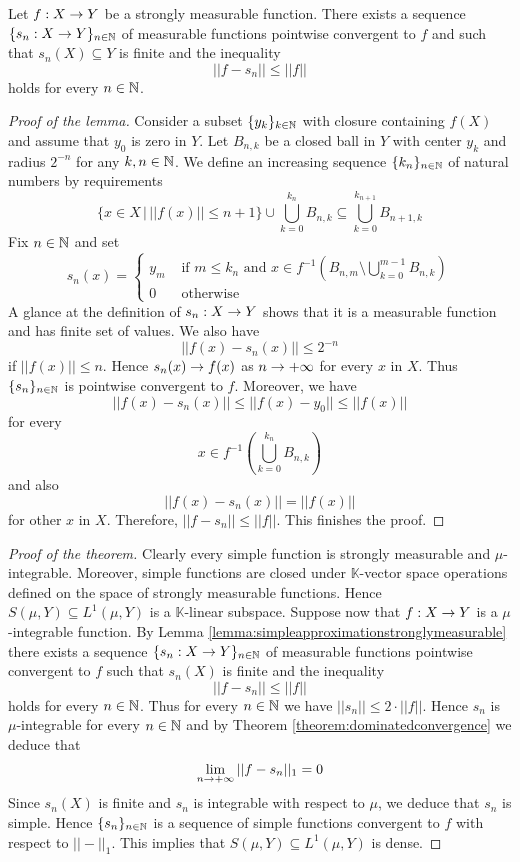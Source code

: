 \begin{lemma}\label{lemma:simpleapproximationstronglymeasurable}
Let $f:X\rightarrow Y$ be a strongly measurable function. There exists a sequence $\{s_n:X\rightarrow Y\}_{n\in {\mathbb N}}$ of measurable functions pointwise convergent to $f$ and such that $s_n(X)\subseteq Y$ is finite and the inequality
$$||f - s_n||\leq ||f||$$
holds for every $n\in {\mathbb N}$.
\end{lemma}
\begin{proof}[Proof of the lemma]
Consider a subset $\{y_k\}_{k\in {\mathbb N}}$ with closure containing $f(X)$ and assume that $y_0$ is zero in $Y$. Let $B_{n,k}$ be a closed ball in $Y$ with center $y_k$ and radius $2^{-n}$ for any $k,n\in {\mathbb N}$. We define an increasing sequence $\{k_n\}_{n\in {\mathbb N}}$ of natural numbers by requirements
$$\big\{x\in X\,\big|\,||f(x)||\leq n+1\big\} \cup \bigcup_{k=0}^{k_n}B_{n, k}\subseteq \bigcup_{k=0}^{k_{n+1}}B_{n+1, k}$$
Fix $n\in {\mathbb N}$ and set
$$s_n(x) = \begin{cases}
y_m & \mbox{ if }m\leq k_n\mbox{ and }x\in f^{-1}\left(B_{n, m}\setminus \bigcup_{k=0}^{m-1}B_{n, k}\right)\\
0 & \mbox{ otherwise}
\end{cases}$$
A glance at the definition of $s_n:X\rightarrow Y$ shows that it is a measurable function and has finite set of values. We also have
$$||f(x) - s_n(x)||\leq 2^{-n}$$
if $||f(x)||\leq n$. Hence $s_n(x) \rightarrow f(x)$ as $n\rightarrow +\infty$ for every $x$ in $X$. Thus $\{s_n\}_{n\in {\mathbb N}}$ is pointwise convergent to $f$. Moreover, we have
$$||f(x) - s_n(x)||\leq ||f(x) - y_0||\leq ||f(x)||$$
for every
$$x\in f^{-1}\left(\bigcup_{k=0}^{k_n}B_{n,k}\right)$$
and also
$$||f(x) - s_n(x)|| = ||f(x)||$$
for other $x$ in $X$. Therefore, $||f - s_n||\leq ||f||$. This finishes the proof.
\end{proof}

\begin{proof}[Proof of the theorem]
Clearly every simple function is strongly measurable and $\mu$-integrable. Moreover, simple functions are closed under $\mathbb{K}$-vector space operations defined on the space of strongly measurable functions. Hence $S(\mu, Y)\subseteq L^1(\mu, Y)$ is a $\mathbb{K}$-linear subspace. Suppose now that $f:X\rightarrow Y$ is a $\mu$-integrable function. By Lemma \ref{lemma:simpleapproximationstronglymeasurable} there exists a sequence $\{s_n:X\rightarrow Y\}_{n\in {\mathbb N}}$ of measurable functions pointwise convergent to $f$ such that $s_n(X)$ is finite and the inequality
$$||f - s_n||\leq ||f||$$
holds for every $n\in {\mathbb N}$. Thus for every $n\in {\mathbb N}$ we have $||s_n||\leq 2\cdot ||f||$. Hence $s_n$ is $\mu$-integrable for every $n\in {\mathbb N}$ and by Theorem \ref{theorem:dominatedconvergence} we deduce that
$$\lim_{n\rightarrow +\infty}||f - s_n||_1 = 0$$
Since $s_n(X)$ is finite and $s_n$ is integrable with respect to $\mu$, we deduce that $s_n$ is simple. Hence $\{s_n\}_{n\in {\mathbb N}}$ is a sequence of simple functions convergent to $f$ with respect to $||-||_1$. This implies that $S(\mu, Y)\subseteq L^1(\mu, Y)$ is dense.
\end{proof}

